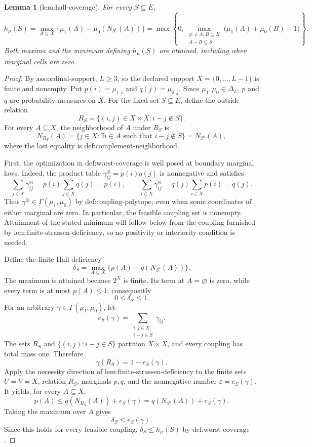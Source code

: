 \documentclass{article}
\newtheorem{lemma}{Lemma}
\begin{document}
\begin{lemma}[lem:hall-coverage]\label{lem:hall-coverage}
For every \(S\subseteq E\), \[h_{\mu}(S)=\max_{A\subseteq X}\{\mu_1(A)-\mu_0(N_{S^{\mathsf c}}(A))\}=\max\!\left\{0,\max_{\substack{\varnothing\neq A,B\subseteq X\\A-B\subseteq S}}\bigl(\mu_1(A)+\mu_0(B)-1\bigr)\right\}.\] Both maxima and the minimum defining \(h_{\mu}(S)\) are attained, including when marginal cells are zero.
\end{lemma}
\begin{proof}
By \(\text{ass:ordinal-support}\), \(L\geq 3\), so the declared support \(X=\{0,\ldots,L-1\}\) is finite and nonempty.  Put \(p(i)=\mu_{1,i}\) and \(q(j)=\mu_{0,j}\).  Since \(\mu_1,\mu_0\in\Delta_L\), \(p\) and \(q\) are probability measures on \(X\).  For the fixed set \(S\subseteq E\), define the outside relation
\[
R_S=\{(i,j)\in X\times X:i-j\notin S\}.
\]
For every \(A\subseteq X\), the neighborhood of \(A\) under \(R_S\) is
\[
N_{R_S}(A)=\{j\in X:\exists i\in A\text{ such that }i-j\notin S\}
=N_{S^{\mathsf c}}(A),
\]
where the last equality is \(\text{def:complement-neighborhood}\).

First, the optimization in \(\text{def:worst-coverage}\) is well posed at boundary marginal laws.  Indeed, the product table \(\gamma^{\otimes}_{ij}=p(i)q(j)\) is nonnegative and satisfies
\[
\sum_{j\in X}\gamma^{\otimes}_{ij}=p(i)\sum_{j\in X}q(j)=p(i),
\qquad
\sum_{i\in X}\gamma^{\otimes}_{ij}=q(j)\sum_{i\in X}p(i)=q(j).
\]
Thus \(\gamma^{\otimes}\in\Gamma(\mu_1,\mu_0)\) by \(\text{def:coupling-polytope}\), even when some coordinates of either marginal are zero.  In particular, the feasible coupling set is nonempty.  Attainment of the stated minimum will follow below from the coupling furnished by \(\text{lem:finite-strassen-deficiency}\), so no positivity or interiority condition is needed.

Define the finite Hall deficiency
\[
\delta_S=\max_{A\subseteq X}\bigl\{p(A)-q(N_{S^{\mathsf c}}(A))\bigr\}.
\]
The maximum is attained because \(2^X\) is finite.  Its term at \(A=\varnothing\) is zero, while every term is at most \(p(A)\leq1\); consequently
\[
0\leq\delta_S\leq1.
\]
For an arbitrary \(\gamma\in\Gamma(\mu_1,\mu_0)\), let
\[
e_S(\gamma)=\sum_{\substack{i,j\in X\\i-j\in S}}\gamma_{ij}.
\]
The sets \(R_S\) and \(\{(i,j):i-j\in S\}\) partition \(X\times X\), and every coupling has total mass one.  Therefore
\[
\gamma(R_S)=1-e_S(\gamma).
\]
Apply the necessity direction of \(\text{lem:finite-strassen-deficiency}\) to the finite sets \(U=V=X\), relation \(R_S\), marginals \(p,q\), and the nonnegative number \(\varepsilon=e_S(\gamma)\).  It yields, for every \(A\subseteq X\),
\[
p(A)\leq q(N_{R_S}(A))+e_S(\gamma)
=q(N_{S^{\mathsf c}}(A))+e_S(\gamma).
\]
Taking the maximum over \(A\) gives
\[
\delta_S\leq e_S(\gamma).
\]
Since this holds for every feasible coupling, \(\delta_S\leq h_\mu(S)\) by \(\text{def:worst-coverage}\).


\end{proof}
\end{document}
